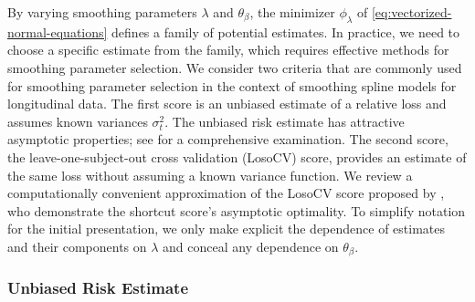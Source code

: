 By varying smoothing parameters $\lambda$ and $\theta_\beta$, the minimizer $\phi_\lambda$ of \eqref{eq:vectorized-normal-equations} defines a family of potential estimates. In practice, we need to choose a specific estimate from the family, which requires effective methods for smoothing parameter selection. We consider two criteria that are commonly used for smoothing parameter selection in the context of smoothing spline models for longitudinal data. The first score is an unbiased estimate of a relative loss and assumes known variances $\sigma_t^2$. The unbiased risk estimate has attractive asymptotic properties; see \cite{gu2013smoothing} for a comprehensive examination. The second score, the leave-one-subject-out cross validation (LosoCV) score, provides an estimate of the same loss without assuming a known variance function. We review a computationally convenient approximation of the LosoCV score proposed by \cite{xu2012asymptotic}, who demonstrate the shortcut score's asymptotic optimality. To simplify notation for the initial presentation, we only make explicit the dependence of estimates and their components on $\lambda$ and conceal any dependence on $\theta_\beta$. 


\subsubsection{Unbiased Risk Estimate}

